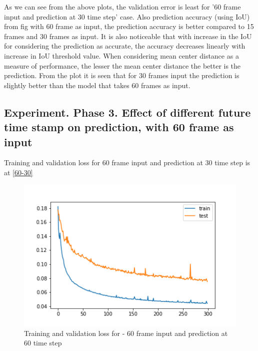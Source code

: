 



As we can see from the above plots, the validation error is least for '60 frame input and prediction at 30 time step' case. Also prediction accuracy (using IoU) from fig with 60 frame as input, the prediction accuracy is better compared to 15 frames and 30 frames as input. It is also noticeable that with increase in the IoU for considering the prediction as accurate, the accuracy decreases linearly with increase in IoU threshold value. When considering mean center distance as a measure of performance, the lesser the mean center distance the better is the prediction. From the plot it is seen that for 30 frames input the prediction is slightly better than the model that takes 60 frames as input.

\subsection{Experiment. Phase 3. Effect of different future time stamp on prediction, with 60 frame as input}
Training and validation loss for 60 frame input and prediction at 30 time step is at \ref{60-30}

\begin{figure}[H] \label{60-60}
\includegraphics[scale=0.8]{conf12_300e_60_60ffuture}
\begin{center}
\caption{Training and validation loss for - 60 frame input and prediction at 60 time step }
\end{center}
\end{figure}

